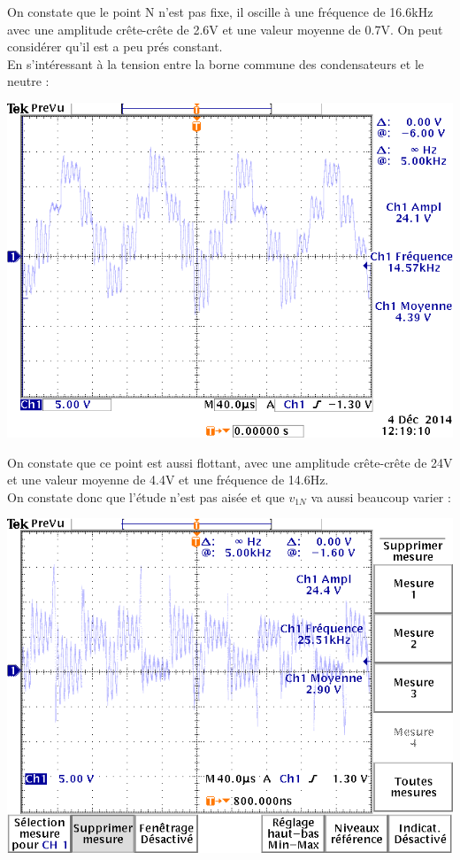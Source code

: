 \documentclass[10pt,a4paper]{article}
\begin{document}
	On constate que le point N n'est pas fixe, il oscille à une fréquence de 16.6kHz avec une amplitude crête-crête de 2.6V et une valeur moyenne de 0.7V. On peut considérer qu'il est a peu prés constant.\\
	\bigbreak
	En s'intéressant à la tension entre la borne commune des condensateurs et le neutre :
	\begin{center}
	\includegraphics[scale=0.4]{vc0.png}
	\end{center}
	On constate que ce point est aussi flottant, avec une amplitude crête-crête de 24V et une valeur moyenne de 4.4V et une fréquence de 14.6Hz.\\
	On constate donc que l'étude n'est pas aisée et que $v_{1N}$ va aussi beaucoup varier :
\begin{center}
	\includegraphics[scale=0.4]{v1n.png}
	\end{center}
\end{document}
